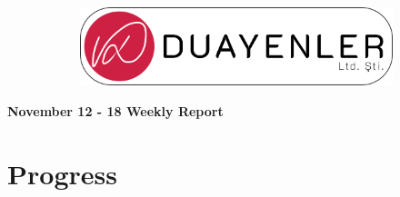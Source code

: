 \documentclass[a4paper,12pt]{article}
\begin{document}
	
\begin{figure}
	\vspace*{-.7cm}
	\centering
	\begin{figure}[H]
		\centering
		\setlength{\unitlength}{\textwidth} 
		\includegraphics[width=0.9\unitlength]{../../../Documents/logos/logo3-with-stroke}
	\end{figure}
\end{figure}
\vspace*{-1.7cm}
\begin{center}
	\Large\textbf{November 12 - 18 Weekly Report}
	\end{center}



\section{Progress}
	
\end{document}
